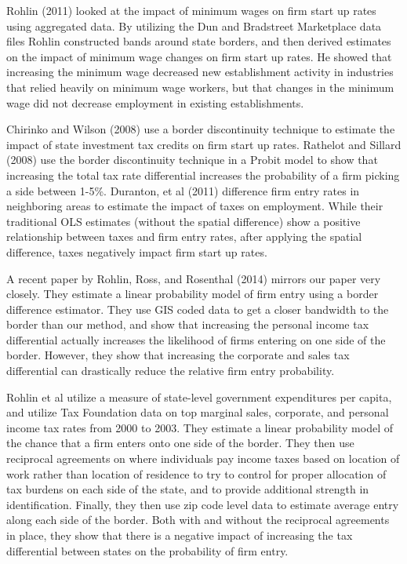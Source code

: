 Rohlin (2011) looked at the impact of minimum wages on firm start up rates using aggregated data. By utilizing the Dun and Bradstreet Marketplace data files Rohlin constructed bands around state borders, and then derived estimates on the impact of minimum wage changes on firm start up rates. He showed that increasing the minimum wage decreased new establishment activity in industries that relied heavily on minimum wage workers, but that changes in the minimum wage did not decrease employment in existing establishments. 

Chirinko and Wilson (2008) use a border discontinuity technique to estimate the impact of state investment tax credits on firm start up rates. Rathelot and Sillard (2008) use the border discontinuity technique in a Probit model to show that increasing the total tax rate differential increases the probability of a firm picking a side between 1-5\%. Duranton, et al (2011)  difference firm entry rates in neighboring areas to estimate the impact of taxes on employment. While their  traditional OLS estimates (without the spatial difference)  show a positive relationship between taxes and firm entry rates, after applying the spatial difference, taxes negatively impact firm start up rates. 

A recent paper by Rohlin, Ross, and Rosenthal (2014) mirrors our paper very closely. They estimate a linear probability model of firm entry using a border difference estimator. They use GIS coded data to get a closer bandwidth to the border than our method, and show that increasing the personal income tax differential actually increases the likelihood of firms entering on one side of the border. However, they show that increasing the corporate and sales tax differential can drastically reduce the relative firm entry probability.

Rohlin et al utilize a measure of state-level government expenditures per capita, and utilize Tax Foundation data on top marginal sales, corporate, and personal income tax rates from 2000 to 2003. They estimate a linear probability model of the chance that a firm enters onto one side of the border. They then use reciprocal agreements on where individuals pay income taxes based on location of work rather than location of residence to try to control for proper allocation of tax burdens on each side of the state, and to provide additional strength in identification. Finally, they then use zip code level data to estimate average entry along each side of the border. Both with and without the reciprocal agreements in place, they show that there is a negative impact of increasing the tax differential between states on the probability of firm entry.

